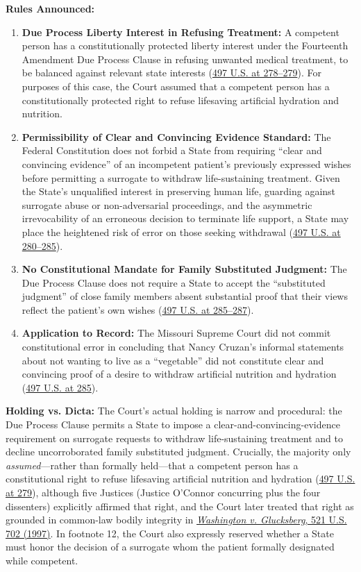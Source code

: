\documentclass[12pt]{article}
\begin{document}
\textbf{Rules Announced:}
\begin{enumerate}
  \item \textbf{Due Process Liberty Interest in Refusing Treatment:} A competent person has a constitutionally protected liberty interest under the Fourteenth Amendment Due Process Clause in refusing unwanted medical treatment, to be balanced against relevant state interests (\href{https://supreme.justia.com/cases/federal/us/497/261/}{497 U.S. at 278--279}). For purposes of this case, the Court assumed that a competent person has a constitutionally protected right to refuse lifesaving artificial hydration and nutrition.
  \item \textbf{Permissibility of Clear and Convincing Evidence Standard:} The Federal Constitution does not forbid a State from requiring ``clear and convincing evidence'' of an incompetent patient's previously expressed wishes before permitting a surrogate to withdraw life-sustaining treatment. Given the State's unqualified interest in preserving human life, guarding against surrogate abuse or non-adversarial proceedings, and the asymmetric irrevocability of an erroneous decision to terminate life support, a State may place the heightened risk of error on those seeking withdrawal (\href{https://supreme.justia.com/cases/federal/us/497/261/}{497 U.S. at 280--285}).
  \item \textbf{No Constitutional Mandate for Family Substituted Judgment:} The Due Process Clause does not require a State to accept the ``substituted judgment'' of close family members absent substantial proof that their views reflect the patient's own wishes (\href{https://supreme.justia.com/cases/federal/us/497/261/}{497 U.S. at 285--287}).
  \item \textbf{Application to Record:} The Missouri Supreme Court did not commit constitutional error in concluding that Nancy Cruzan's informal statements about not wanting to live as a ``vegetable'' did not constitute clear and convincing proof of a desire to withdraw artificial nutrition and hydration (\href{https://supreme.justia.com/cases/federal/us/497/261/}{497 U.S. at 285}).
\end{enumerate}

\textbf{Holding vs. Dicta:} The Court's actual holding is narrow and procedural: the Due Process Clause permits a State to impose a clear-and-convincing-evidence requirement on surrogate requests to withdraw life-sustaining treatment and to decline uncorroborated family substituted judgment. Crucially, the majority only \textit{assumed}---rather than formally held---that a competent person has a constitutional right to refuse lifesaving artificial nutrition and hydration (\href{https://supreme.justia.com/cases/federal/us/497/261/}{497 U.S. at 279}), although five Justices (Justice O'Connor concurring plus the four dissenters) explicitly affirmed that right, and the Court later treated that right as grounded in common-law bodily integrity in \href{https://supreme.justia.com/cases/federal/us/521/702/}{\textit{Washington v. Glucksberg}, 521 U.S. 702 (1997)}. In footnote 12, the Court also expressly reserved whether a State must honor the decision of a surrogate whom the patient formally designated while competent.
\end{document}
